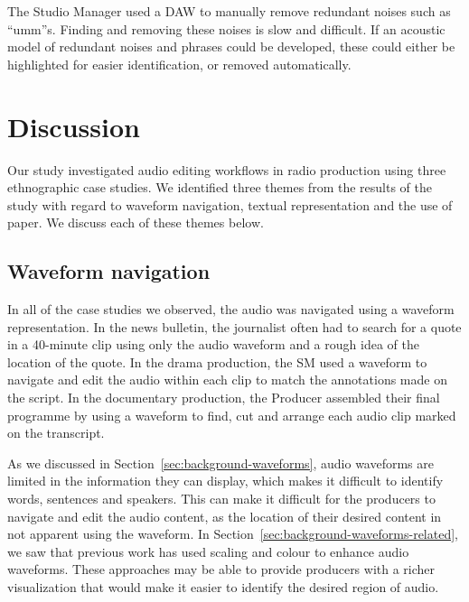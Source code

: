 The Studio Manager used a DAW to manually remove redundant noises such as ``umm''s.  Finding and removing these noises
is slow and difficult. If an acoustic model of redundant noises and phrases could be developed, these could either be
highlighted for easier identification, or removed automatically.

\section{Discussion}\label{sec:ethno-discussion}
Our study investigated audio editing workflows in radio production using three ethnographic case studies. We identified
three themes from the results of the study with regard to waveform navigation, textual representation and the use of
paper. We discuss each of these themes below.

\subsection{Waveform navigation}
In all of the case studies we observed, the audio was navigated using a waveform representation.  In the news bulletin,
the journalist often had to search for a quote in a 40-minute clip using only the audio waveform and a rough idea of
the location of the quote.  In the drama production, the SM used a waveform to navigate and edit the audio within each
clip to match the annotations made on the script.  In the documentary production, the Producer assembled their final
programme by using a waveform to find, cut and arrange each audio clip marked on the transcript.

As we discussed in Section~\ref{sec:background-waveforms}, audio waveforms are limited in the information they can
display, which makes it difficult to identify words, sentences and speakers.  This can make it difficult for the
producers to navigate and edit the audio content, as the location of their desired content in not apparent using the
waveform. In Section~\ref{sec:background-waveforms-related}, we saw that previous work has used scaling and colour to
enhance audio waveforms. These approaches may be able to provide producers with a richer visualization that would make
it easier to identify the desired region of audio.


